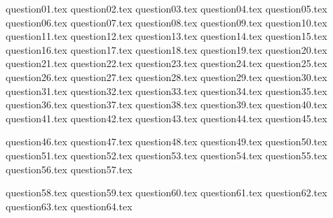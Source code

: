 \documentclass[a4paper, 11pt]{article}
\begin{document}
{question01.tex}
{question02.tex}
{question03.tex}
{question04.tex}
{question05.tex}
{question06.tex}
{question07.tex}
{question08.tex}
{question09.tex}
{question10.tex}
{question11.tex}
{question12.tex}
{question13.tex}
{question14.tex}
{question15.tex}
{question16.tex}
{question17.tex}
{question18.tex}
{question19.tex}
{question20.tex}
{question21.tex}
{question22.tex}
{question23.tex}
{question24.tex}
{question25.tex}
{question26.tex}
{question27.tex}
{question28.tex}
{question29.tex}
{question30.tex}
{question31.tex}
{question32.tex}
{question33.tex}
{question34.tex}
{question35.tex}
{question36.tex}
{question37.tex}
{question38.tex}
{question39.tex}
{question40.tex}
{question41.tex}
{question42.tex}
{question43.tex}
{question44.tex}
{question45.tex}

\renewcommand{\A}{\mathfrak{A}}
\renewcommand{\B}{\mathfrak{B}}

{question46.tex}
{question47.tex}
{question48.tex}
{question49.tex}
{question50.tex}
{question51.tex}
{question52.tex}
{question53.tex}
{question54.tex}
{question55.tex}
{question56.tex}
{question57.tex}

\renewcommand{\A}{\mathcal{A}}
\renewcommand{\B}{\mathcal{B}}

{question58.tex}
{question59.tex}
{question60.tex}
{question61.tex}
{question62.tex}
{question63.tex}
{question64.tex}
\end{document}
